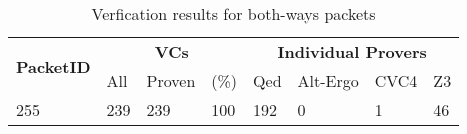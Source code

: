 \FloatBarrier  %

\begin{table}[hbt]
\begin{center}
    \begin{tabular}{|m{10ex}|m{5ex}m{5ex}m{5ex}|m{5ex}m{5ex}m{5ex}m{5ex}|}
\hline
\multirow{2}{*}{\textbf{PacketID}} &
\multicolumn{3}{c|}{ \textbf{VCs}} &
\multicolumn{4}{c|}{\textbf{Individual Provers}}\\
\cline{2-8}
               &  All & Proven & (\%) & Qed & Alt-Ergo & CVC4 & Z3  \\
\hline
\hline
255 & 239 & 239 & 100 & 192 & 0 & 1 & 46\\
\hline
\end{tabular}
\end{center}
\caption{\label{tbl:packets-without-niter-bothways} Verfication results for both-ways packets}
\end{table}

\FloatBarrier  %

